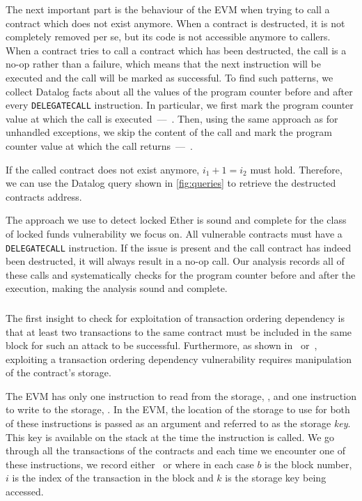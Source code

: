 The next important part is the behaviour of the EVM when trying to call a contract which does not exist anymore.
When a contract is destructed, it is not completely removed per se, but its code is not accessible anymore to callers.
When a contract tries to call a contract which has been destructed, the call is a no-op rather than a failure, which means that the next instruction will be executed and the call will be marked as successful.
To find such patterns, we collect Datalog facts about all the values of the program counter before and after every \lstinline{DELEGATECALL} instruction. In particular, we first mark the program counter value at which the call is executed~---~. Then, using the same approach as for unhandled exceptions, we skip the content of the call and mark the program counter value at which the call returns~---~.

If the called contract does not exist anymore, $i_1 + 1 = i_2$ must hold. Therefore, we can use the Datalog query shown in \autoref{fig:queries} to retrieve the destructed contracts address.

\correctness The approach we use to detect locked Ether is sound and complete for the class of locked funds vulnerability we focus on. All vulnerable contracts must have a \lstinline{DELEGATECALL} instruction. If the issue is present and the call contract has indeed been destructed, it will always result in a no-op call. Our analysis records all of these calls and systematically checks for the program counter before and after the execution, making the analysis sound and complete.


\subsubsection{\transactionorder}
The first insight to check for exploitation of transaction ordering dependency is that at least two transactions to the same contract must be included in the same block for such an attack to be successful. Furthermore, as shown in~\cite{luu2016a} or~\cite{Tsankov2018}, exploiting a transaction ordering dependency vulnerability requires manipulation of the contract's storage.

The EVM has only one instruction to read from the storage, , and one instruction to write to the storage, . In the EVM, the location of the storage to use for both of these instructions is passed as an argument and referred to as the storage \emph{key}. This key is available on the stack at the time the instruction is called. We go through all the transactions of the contracts and each time we encounter one of these instructions, we record either~ or  where in each case $b$ is the block number, $i$ is the index of the transaction in the block and $k$ is the storage key being accessed.

